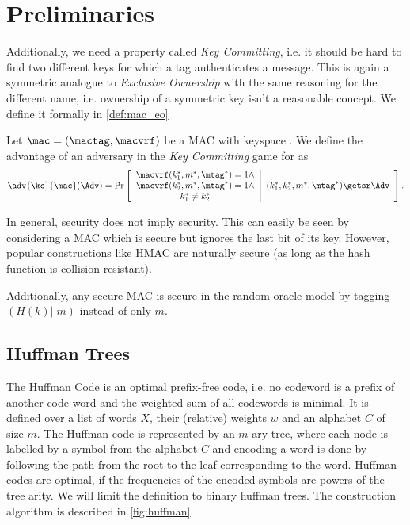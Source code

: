 \section{Preliminaries}
Additionally, we need a property called \emph{Key Committing}, i.e. it should be hard to find two different keys
for which a tag authenticates a message. This is again a symmetric analogue to \emph{Exclusive Ownership} with the same
reasoning for the different name, i.e. ownership of a symmetric key isn't a reasonable concept. We define it formally in \cref{def:mac_eo}

\begin{definition}\label{def:mac_eo}
  Let $\mac = (\mactag, \macvrf)$ be a MAC with keyspace \mackeyspace. We define the advantage of an adversary \Adv
  in the \emph{Key Committing} game for \mac as
  \[
    \adv{\kc}{\mac}(\Adv) = \text{Pr}\left[
      \begin{array}{c} \macvrf(k^*_1,m^*,\mtag^*) = 1 \land \\
        \macvrf(k^*_2,m^*,\mtag^*) = 1 \land \\
        k^*_1 \neq k^*_2
      \end{array}
      \middle\vert
      \begin{array}{c}
        (k_1^*,k_2^*,m^*,\mtag^*) \getsr \Adv
      \end{array}
    \right].
  \]
\end{definition}

\begin{remark}
  In general, \ufcma security does not imply \kc security. This can easily be seen by considering a MAC which is
  \ufcma secure but ignores the last bit of its key. However, popular constructions like HMAC are naturally \kc
  secure (as long as the hash function is collision resistant).

  Additionally, any \ufcma secure MAC is \kc secure in the random oracle model by tagging $(H(k)||m)$ instead of only
  $m$.
\end{remark}


\subsection{Huffman Trees}\label{sec:huffman}
The Huffman Code\cite{huffman52} is an optimal prefix-free code, i.e. no codeword is a prefix of another code word and
the weighted sum of all codewords is minimal. It is defined over a list of words $X$, their (relative)
weights $w$ and an alphabet $C$ of size $m$. The Huffman code is represented by an $m$-ary tree,
where each node is labelled by a symbol from the alphabet $C$ and encoding a word is done by following the path from the
root to the leaf corresponding to the word. Huffman codes are optimal, if the frequencies of the encoded symbols are
powers of the tree arity. We will limit the definition to binary huffman trees. The construction algorithm is described
in \cref{fig:huffman}.

